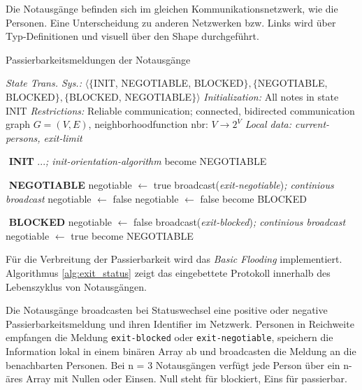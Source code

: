 Die Notausgänge befinden sich im gleichen Kommunikationsnetzwerk, wie die Personen. Eine Unterscheidung zu anderen Netzwerken bzw. Links wird über Typ-Definitionen und visuell über den Shape durchgeführt.

\begin{algorithm}
\caption{Passierbarkeitsmeldungen der Notausgänge}
\label{alg:exit_status}
\begin{algorithmic} 
\STATE \textit{State Trans. Sys.:} $\langle\{$INIT, NEGOTIABLE, BLOCKED$\}, \{$NEGOTIABLE, BLOCKED$\}, \{$BLOCKED, NEGOTIABLE$\}\rangle$
\STATE \textit{Initialization:} All notes in state INIT
\STATE \textit{Restrictions:} Reliable communication; connected, bidirected communication graph $G = (V,E)$, neighborhoodfunction nbr: $V \rightarrow 2^{V}$
\STATE \textit{Local data: current-persons, exit-limit}

\STATE $ $
\STATE \textbf{INIT}
\STATE ...\hfill\emph{; init-orientation-algorithm}
\STATE become NEGOTIABLE

\STATE $ $
\STATE \textbf{NEGOTIABLE}
\STATE negotiable $\leftarrow$ true
\STATE broadcast(\textit{exit-negotiable})\hfill\emph{; continious broadcast}
\STATE negotiable $\leftarrow$ false
\ENDIF
{}
\STATE negotiable $\leftarrow$ false
\ENDIF
\ENDWHILE
\STATE become BLOCKED


\STATE $ $
\STATE \textbf{BLOCKED}
\STATE negotiable $\leftarrow$ false
\STATE broadcast(\textit{exit-blocked})\hfill\emph{; continious broadcast}
\STATE negotiable $\leftarrow$ true
\ENDIF
\ENDWHILE
\STATE become NEGOTIABLE

\end{algorithmic}
\end{algorithm}

Für die Verbreitung der Passierbarkeit wird das \emph{Basic Flooding} implementiert. Algorithmus \ref{alg:exit_status} zeigt das eingebettete Protokoll innerhalb des Lebenszyklus von Notausgängen. 

Die Notausgänge broadcasten bei Statuswechsel eine positive oder negative Passierbarkeitsmeldung und ihren Identifier im Netzwerk. Personen in Reichweite empfangen die Meldung \verb|exit-blocked| oder \verb|exit-negotiable|, speichern die Information lokal in einem binären Array ab und broadcasten die Meldung an die benachbarten Personen. Bei n = 3 Notausgängen verfügt jede Person über ein n-äres Array mit Nullen oder Einsen. Null steht für blockiert, Eins für passierbar.





